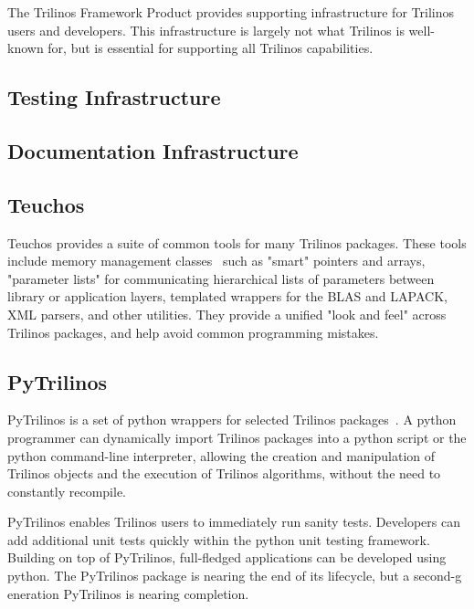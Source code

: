 
The Trilinos Framework Product provides supporting infrastructure for Trilinos users and developers. This infrastructure is largely not what Trilinos is well-known for, but is essential for supporting all Trilinos capabilities.

\subsection{Testing Infrastructure}

\subsection{Documentation Infrastructure}

\subsection{Teuchos}

Teuchos provides a suite of common tools for many Trilinos packages. These tools include memory management classes~\cite{bartlett2010} such as "smart" pointers and arrays, "parameter lists" for communicating hierarchical lists of parameters between library or application layers, templated wrappers for the BLAS and LAPACK, XML parsers, and other utilities. They provide a unified "look and feel" across Trilinos packages, and help avoid common programming mistakes.

\subsection{PyTrilinos}

PyTrilinos is a set of python wrappers for selected Trilinos packages~\cite{PyTrilinos}. A python programmer can dynamically import Trilinos packages into a python script or the python command-line interpreter, allowing the creation and manipulation of Trilinos objects and the execution of Trilinos algorithms, without the need to constantly recompile.

PyTrilinos enables Trilinos users to immediately run sanity tests. Developers can add additional unit tests quickly within the python unit testing framework. Building on top of PyTrilinos, full-fledged applications can be developed using python. The PyTrilinos package is nearing the end of its lifecycle, but a second-g
eneration PyTrilinos is nearing completion.

